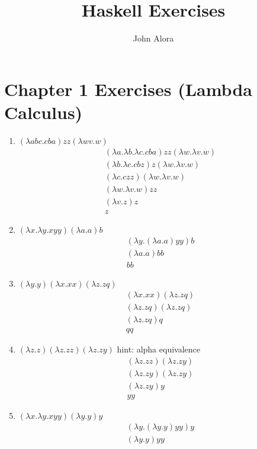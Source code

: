 \documentclass[a4paper, 11pt]{article}
\begin{document}
\title{Haskell Exercises}
\author{John Alora}
\date{}
\maketitle

\section{Chapter 1 Exercises (Lambda Calculus)}

\begin{enumerate}
\item $(\lambda abc.cba) zz (\lambda wv.w)$
%
\begin{align*}
(\lambda a.\lambda b.\lambda c.cba)zz(\lambda w.\lambda v.w) \\
(\lambda b.\lambda c.cbz)z(\lambda w.\lambda v.w) \\
(\lambda c.czz)(\lambda w.\lambda v.w) \\
(\lambda w.\lambda v.w)zz \\
(\lambda v.z)z \\
z
\end{align*}
%
\item $(\lambda x.\lambda y. xyy)(\lambda a.a)b$
%
\begin{align*}
(\lambda y.(\lambda a.a)yy)b \\
(\lambda a.a)bb \\
bb
\end{align*}
%
\item $(\lambda y.y)(\lambda x.xx) (\lambda z.zq)$
%
\begin{align*}
(\lambda x.xx)(\lambda z.zq) \\
(\lambda z.zq)(\lambda z.zq) \\
(\lambda z.zq)q \\
qq
\end{align*}
%
\item $(\lambda z.z)(\lambda z.zz)(\lambda z.zy)$ \qquad hint: alpha equivalence
%
\begin{align*}
(\lambda z.zz)(\lambda z.zy) \\
(\lambda z.zy)(\lambda z.zy) \\
(\lambda z.zy)y \\
yy
\end{align*}
%
\item $(\lambda x.\lambda y.xyy)(\lambda y.y)y$
%
\begin{align*}
(\lambda y.(\lambda y.y)yy)y \\
(\lambda y.y)yy \\

\end{align*}
\end{enumerate}
\end{document}
